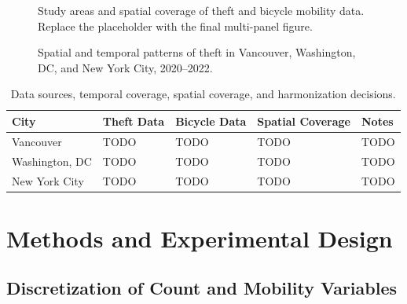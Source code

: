\documentclass[applsci,article,submit,moreauthors]{Definitions/mdpi}
\begin{document}
\begin{figure}[H]
\centering
{}
\caption{Study areas and spatial coverage of theft and bicycle mobility data. Replace the placeholder with the final multi-panel figure.}
\label{fig:study_areas}
\end{figure}

\begin{figure}[H]
\centering
{}
\caption{Spatial and temporal patterns of theft in Vancouver, Washington, DC, and New York City, 2020--2022.}
\label{fig:descriptive_patterns}
\end{figure}

\begin{table}[H]
\caption{Data sources, temporal coverage, spatial coverage, and harmonization decisions.}
\label{tab:data_sources}
\begin{tabularx}{\textwidth}{lXXXX}
\toprule
\textbf{City} & \textbf{Theft Data} & \textbf{Bicycle Data} & \textbf{Spatial Coverage} & \textbf{Notes}\\
\midrule
Vancouver & TODO & TODO & TODO & TODO\\
Washington, DC & TODO & TODO & TODO & TODO\\
New York City & TODO & TODO & TODO & TODO\\
\bottomrule
\end{tabularx}
\end{table}

\section{Methods and Experimental Design}
\label{sec:methods}

\subsection{Discretization of Count and Mobility Variables}
\label{subsec:discretization}
\end{document}

